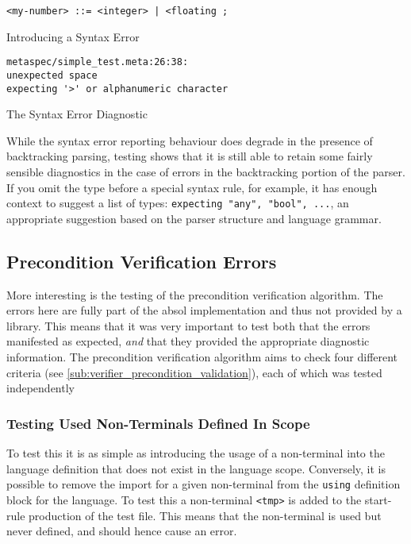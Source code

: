 \begin{listing}[!htb]
\begin{verbatim}
<my-number> ::= <integer> | <floating ;
\end{verbatim}
\caption{Introducing a Syntax Error}
\label{lst:introducing_a_syntax_error}
\end{listing}

\begin{listing}[!htb]
\begin{verbatim}
metaspec/simple_test.meta:26:38:
unexpected space
expecting '>' or alphanumeric character
\end{verbatim}
\caption{The Syntax Error Diagnostic}
\label{lst:the_syntax_error_diagnostic}
\end{listing}

While the syntax error reporting behaviour does degrade in the presence of backtracking parsing, testing shows that it is still able to retain some fairly sensible diagnostics in the case of errors in the backtracking portion of the parser. 
If you omit the type before a special syntax rule, for example, it has enough context to suggest a list of types: \texttt{expecting "any", "bool", ...}, an appropriate suggestion based on the parser structure and language grammar.


\subsection{Precondition Verification Errors} %
\label{sub:precondition_verification_errors}
More interesting is the testing of the precondition verification algorithm.
The errors here are fully part of the \gls{absol} implementation and thus not provided by a library. 
This means that it was very important to test both that the errors manifested as expected, \textit{and} that they provided the appropriate diagnostic information.
The precondition verification algorithm aims to check four different criteria (see \autoref{sub:verifier_precondition_validation}), each of which was tested independently

\subsubsection{Testing Used Non-Terminals Defined In Scope} %
\label{ssub:testing_used_non_terminals_defined_in_scope}
To test this it is as simple as introducing the usage of a non-terminal into the language definition that does not exist in the language scope. 
Conversely, it is possible to remove the import for a given non-terminal from the \texttt{using} definition block for the language.
To test this a non-terminal \texttt{<tmp>} is added to the start-rule production of the test file. 
This means that the non-terminal is used but never defined, and should hence cause an error.

